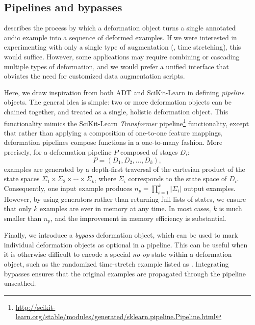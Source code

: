 \documentclass{article}
\begin{document}
\subsection{Pipelines and bypasses}
 describes the process by which a deformation object turns a
single annotated audio example into a sequence of deformed examples.  If we were
interested in experimenting with only a single type of augmentation (\eg, time stretching), 
this would suffice.  However, some applications may require combining or cascading
multiple types of deformation, and we would prefer a unified interface that obviates the
need for customized data augmentation scripts.

Here, we draw inspiration from both ADT and SciKit-Learn in defining \emph{pipeline}
objects.  The general idea is simple: two or more deformation objects can be chained
together, and treated as a single, holistic deformation object.  This functionality
mimics the SciKit-Learn \emph{Transformer} pipeline\footnote{\url{http://scikit-learn.org/stable/modules/generated/sklearn.pipeline.Pipeline.html}} functionality, except that rather
than applying a composition of one-to-one feature mappings, deformation pipelines
compose functions in a one-to-many fashion.  More precisely, for a deformation pipeline
$P$ composed of stages $D_i$:
\[
P = (D_1, D_2, \dots, D_k),
\]examples are generated by a depth-first traversal of the 
cartesian product of the state spaces
${\Sigma_1 \times \Sigma_2 \times \cdots \times \Sigma_k}$, where $\Sigma_i$ corresponds
to the state space of $D_i$.  Consequently, one input example produces $n_p = \prod_{i=1}^k
|\Sigma_i|$ output examples.  However, by using generators rather than returning full
lists of states, we ensure that only $k$ examples are ever in memory at any time.
In most cases, $k$ is much smaller than $n_p$, and the improvement in memory efficiency
is substantial.

Finally, we introduce a \emph{bypass} deformation object, which can be used to mark
individual deformation objects as optional in a pipeline.  This can be useful when it is
otherwise difficult to encode a special \emph{no-op} state within a deformation object, 
such as the randomized time-stretch example listed as .  Integrating
bypasses ensures that the original examples are propagated through the pipeline unscathed.
\end{document}
